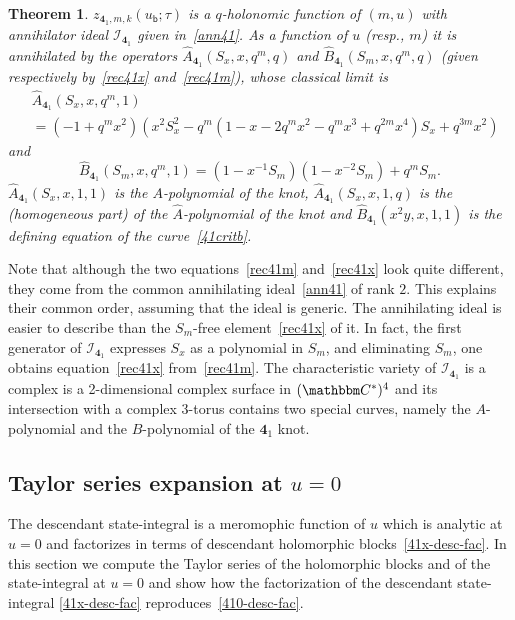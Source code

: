 \documentclass[12pt,reqno]{amsart}
\newtheorem{theorem}{Theorem}
\theoremstyle{definition}
\def\BC{\mathbbm C}
\def\calI{\mathcal I}
\def\calI{\mathcal I}
\def\Ahat{\widehat{A}}
\def\Bhat{\widehat{B}}
\def\ub{u_{\mathsf{b}}}
\def\md{\mathbf}
\newcommand{\knot}[1]{\md{#1}}
\begin{document}
\begin{theorem}
  \label{thm.41c}\rm
  $z_{\knot{4}_1,m,k}(\ub;\tau)$ is a $q$-holonomic function of $(m,u)$
  with annihilator ideal $\calI_{\knot{4}_1}$ given in~\eqref{ann41}.
  As a function of $u$ (resp., $m$) it is annihilated by the operators
  $\Ahat_{\knot{4}_1}(S_x,x,q^m,q)$ and
  $\Bhat_{\knot{4}_1}(S_m,x,q^m,q)$ (given respectively
  by~\eqref{rec41x} and~\eqref{rec41m}), whose classical limit is
   \begin{equation}
   \begin{aligned}
     &  \Ahat_{\knot{4}_1}(S_x,x,q^m,1)\\
     & = (-1 + q^{m} x^2) (x^2 S_x^2 -q^m (1 - x -2 q^{m} x^2 - q^{m}
     x^3 + q^{2 m} x^4) S_x + q^{3 m} x^2)
 \end{aligned}
  \end{equation}
  and
  \begin{equation}
    \Bhat_{\knot{4}_1}(S_m,x,q^m,1) = (1-x^{-1}S_m)(1-x^{-2}S_m) + q^m S_m.
  \end{equation}
  $\Ahat_{\knot{4}_1}(S_x,x,1,1)$ is the $A$-polynomial of the knot,
  $\Ahat_{\knot{4}_1}(S_x,x,1,q)$ is the (homogeneous part) of the
  $\Ahat$-polynomial of the knot and $\Bhat_{\knot{4}_1}(x^2y,x,1,1)$
  is the defining equation of the curve~\eqref{41critb}.
\end{theorem}

Note that although the two equations~\eqref{rec41m} and~\eqref{rec41x}
look quite different, they come from the common annihilating
ideal~\eqref{ann41} of rank $2$.  This explains their common order,
assuming that the ideal is generic. The annihilating ideal is easier
to describe than the $S_m$-free element~\eqref{rec41x} of it. In fact,
the first generator of $\calI_{\knot{4}_1}$ expresses $S_x$ as a
polynomial in $S_m$, and eliminating $S_m$, one obtains
equation~\eqref{rec41x} from~\eqref{rec41m}.  The characteristic
variety of $\calI_{\knot{4}_1}$ is a complex is a 2-dimensional
complex surface in $(\BC^*)^4$ and its intersection with a complex
3-torus contains two special curves, namely the $A$-polynomial and the
$B$-polynomial of the $\knot{4}_1$ knot.

\subsection{Taylor series expansion at $u=0$}
\label{sub.41near1}

The descendant state-integral is a meromophic function of $u$ which is
analytic at $u=0$ and factorizes in terms of descendant holomorphic
blocks~\eqref{41x-desc-fac}. In this section we compute the Taylor
series of the holomorphic blocks and of the state-integral at $u=0$
and show how the factorization of the descendant state-integral
\eqref{41x-desc-fac} reproduces~\eqref{410-desc-fac}.
\end{document}
